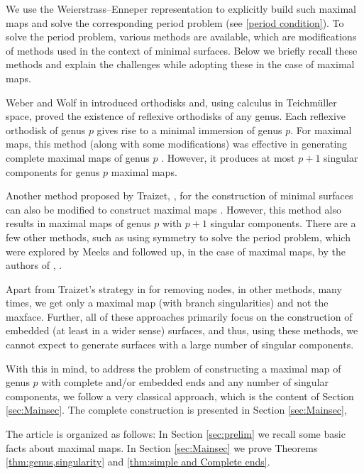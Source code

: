 \documentclass[12pt]{amsart}
\numberwithin{equation}{section}
\begin{document}
We use the Weierstrass–Enneper representation to explicitly build such maximal maps and solve the 
corresponding period problem (see \eqref{period condition}).  To solve the period problem, various methods are 
available, which are modifications of methods used in the context of minimal surfaces. Below we briefly recall
these methods and explain the challenges while adopting these in the case of maximal maps.

Weber and Wolf in \cite{weber2002teichmuller} introduced orthodisks and, using calculus in Teichm\"uller space, 
proved the existence of reflexive orthodisks of any genus. Each reflexive orthodisk of genus \(p\) gives rise to a 
minimal immersion of genus \(p\). For maximal maps, this method (along with some modifications) was effective in 
generating complete maximal maps of genus \(p\) \cite{bardhan2023higher}. However, it produces at most \(p+1\) 
singular components for genus \(p\) maximal maps.

Another method proposed by Traizet, \cite{traizet2002embedded}, for the construction of minimal surfaces can also be 
modified to construct maximal maps \cite{chen2024singularitiesmaxfacesconstructednodeopening}. 
However, this method also results in maximal maps of genus \(p\) with \(p+1\) singular components. There are a few 
other methods, such as using symmetry to solve the period problem, which were explored by Meeks 
\cite{Meeks1989} and followed up, in the case of maximal maps, by the authors of \cite{Kim2006}, 
\cite{Fujimori2009}.    

Apart from Traizet's strategy in \cite{traizet2002embedded} for removing nodes, in other methods, many times, we get 
only a maximal map (with branch singularities) and not the maxface.  Further, all of these approaches primarily 
focus on the construction of embedded (at least in a wider sense) surfaces, and thus, using these methods, we 
cannot expect to generate surfaces with a large number of singular components.

With this in mind, to address the problem of constructing a maximal map of genus \(p\) with complete and/or 
embedded ends and any number of singular components, we follow a very classical approach, which is the
content of Section \ref{sec:Mainsec}. The complete construction is presented in Section \ref{sec:Mainsec}, 

The article is organized as follows: In Section \ref{sec:prelim} we recall some basic facts about maximal maps.  In Section \ref{sec:Mainsec} we prove Theorems 
\ref{thm:genus,singularity} and \ref{thm:simple and Complete ends}.
\end{document}
